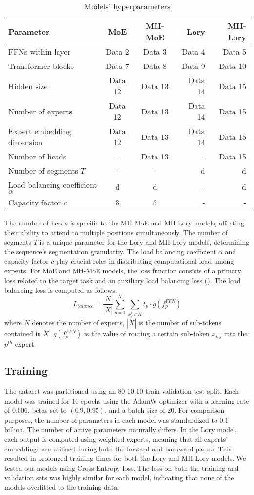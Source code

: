 \documentclass[12pt]{article}
\begin{document}
\begin{table}[h!]
\centering
\begin{tabular}{|l|c|c|r|r|}
\hline
Parameter & \textbf{MoE} & \textbf{MH-MoE} & \textbf{Lory} & \textbf{MH-Lory} \\
\hline
FFNs within layer & Data 2 & Data 3 & Data 4 & Data 5 \\
Transformer blocks & Data 7 & Data 8 & Data 9 & Data 10 \\
Hidden size  & Data 12 & Data 13 & Data 14 & Data 15 \\
Number of experts& Data 12 & Data 13 & Data 14 & Data 15 \\
Expert embedding dimension& Data 12 & Data 13 & Data 14 & Data 15 \\
\hline
Number of heads & - & Data 13 & - & Data 15 \\
Number of segments $T$ & - & - & d & d \\
Load balancing coefficient $\alpha$ & d & d & - & d \\
Capacity factor $c$ & 3 & 3 & - & - \\
\hline
\end{tabular}
\caption{Models' hyperparameters}
\label{tab:hyperparams_table}
\end{table}
The number of heads is specific to the MH-MoE and MH-Lory models, affecting their ability to attend to multiple positions simultaneously. The number of segments $T$ is a unique parameter for the Lory and MH-Lory models, determining the sequence's segmentation granularity. 
The load balancing coefficient $\alpha$ and capacity factor $c$ play crucial roles in distributing computational load among experts. 
For MoE and MH-MoE models, the loss function consists of a primary loss related to the target task and an auxiliary load balancing loss (\cite{wu2024multihead}). The load balancing loss is computed as follows:
\[ L_{balance} = \frac{N}{|\ddot{X}|} \sum_{p=1}^{N} \sum_{x_i^j \in \ddot{X}} t_p \cdot g(f_p^{FFN}) \]
where $N$ denotes the number of experts, $|\ddot{X}|$ is the number of sub-tokens contained in $\ddot{X}$. $g(f_p^{FFN})$ is the value of routing a certain sub-token $x_{i,j}$ into the $p^{th}$ expert.

 
\subsection{Training} 
The dataset was partitioned using an 80-10-10 train-validation-test split. Each model was trained for 10 epochs using the AdamW optimizer with a learning rate of $0.006$, betas set to $(0.9, 0.95)$, and a batch size of 20. For comparison purposes, the number of parameters in each model was standardized to 0.1 billion. The number of active parameters naturally differs. In the Lory model, each output is computed using weighted experts, meaning that all experts' embeddings are utilized during both the forward and backward passes. This resulted in prolonged training times for both the Lory and MH-Lory models. 
We tested our models using Cross-Entropy loss. The loss on both the training and validation sets was highly similar for each model, indicating that none of the models overfitted to the training data. 
\end{document}
